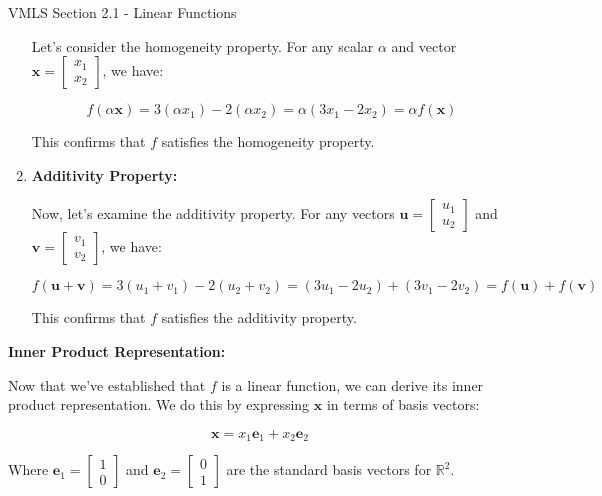 \begin{notes}{VMLS Section 2.1 - Linear Functions}
\begin{highlight}
\begin{enumerate}
            Let's consider the homogeneity property. For any scalar \(\alpha\) and vector \(\mathbf{x} = \begin{bmatrix} x_1 \\ x_2 \end{bmatrix}\), we have:
            
            \[
            f(\alpha\mathbf{x}) = 3(\alpha x_1) - 2(\alpha x_2) = \alpha(3x_1 - 2x_2) = \alpha f(\mathbf{x})
            \]
            
            This confirms that \(f\) satisfies the homogeneity property.
            
            \item \textbf{Additivity Property:}
            
            Now, let's examine the additivity property. For any vectors \(\mathbf{u} = \begin{bmatrix} u_1 \\ u_2 \end{bmatrix}\) and \(\mathbf{v} = \begin{bmatrix} v_1 \\ v_2 \end{bmatrix}\), we have:
            
            \[
            f(\mathbf{u} + \mathbf{v}) = 3(u_1 + v_1) - 2(u_2 + v_2) = (3u_1 - 2u_2) + (3v_1 - 2v_2) = f(\mathbf{u}) + f(\mathbf{v})
            \]
            
            This confirms that \(f\) satisfies the additivity property.
        \end{enumerate}
        
        \vspace*{1em} \textbf{Inner Product Representation:} \vspace*{1em}
        
        Now that we've established that \(f\) is a linear function, we can derive its inner product representation. We do this by expressing \(\mathbf{x}\) in terms of basis vectors:
        
        \[
        \mathbf{x} = x_1\mathbf{e}_1 + x_2\mathbf{e}_2
        \]
        
        Where \(\mathbf{e}_1 = \begin{bmatrix} 1 \\ 0 \end{bmatrix}\) and \(\mathbf{e}_2 = \begin{bmatrix} 0 \\ 1 \end{bmatrix}\) are the standard basis vectors for \(\mathbb{R}^2\).
        

\end{highlight}
\end{notes}
